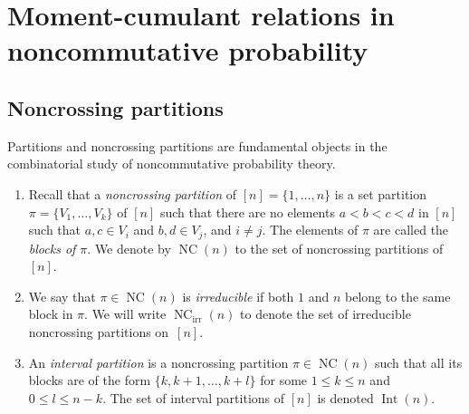 \documentclass[11pt]{article}
\numberwithin{equation}{section}
\numberwithin{equation}{section}
\newcommand{\NC}{\operatorname{NC}}
\newcommand{\Int}{\operatorname{Int}}
\begin{document}
\section{Moment-cumulant relations in noncommutative probability}\label{sec:momentcumulantrel}

\subsection{Noncrossing partitions}

Partitions and noncrossing partitions are fundamental objects in the combinatorial study of noncommutative probability theory.
\begin{Definition}\quad
\begin{enumerate}\itemsep=0pt
\item Recall that a \textit{noncrossing partition} of $[n] = \{1,\dots,n\}$ is a set partition $\pi = \{V_1,\dots,V_k\}$ of $[n]$ such that there are no elements $a<b<c<d$ in $[n]$ such that $a,c \in V_i$ and $b,d \in V_j$, and $i\neq j$. The elements of $\pi$ are called the \textit{blocks of $\pi$}. We denote by $\NC(n)$ to the set of noncrossing partitions of $[n]$.
\item We say that $\pi \in \NC(n)$ is \textit{irreducible} if both $1$ and $n$ belong to the same block in $\pi$. We will write $\NC_{\mathrm{irr}}(n)$ to denote the set of irreducible noncrossing partitions on~$[n]$.
\item An \textit{interval partition} is a noncrossing partition $\pi\in\NC(n)$ such that all its blocks are of the form $\{k,k+1,\dots,k+l\}$ for some $1\leq k\leq n$ and $0\leq l\leq n-k$. The set of interval partitions of $[n]$ is denoted $\Int(n)$.
\end{enumerate}
\end{Definition}
\end{document}

